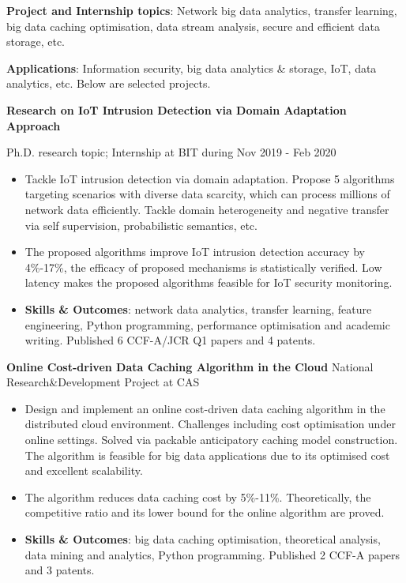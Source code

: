 \documentclass[letterpaper,10.9pt]{article}
\begin{document}
\textbf{Project and Internship topics}: Network big data analytics, transfer learning, big data caching optimisation, data stream analysis, secure and efficient data storage, etc. 

\vspace{2mm}

\textbf{Applications}: Information security, big data analytics \& storage, IoT, data analytics, etc. Below are selected projects. 

\vspace{2mm}

\textbf{Research on IoT Intrusion Detection via Domain Adaptation Approach}

Ph.D. research topic; Internship at BIT during Nov 2019 - Feb 2020

\begin{itemize}
  \setlength\itemsep{2.0pt}
  \item Tackle IoT intrusion detection via domain adaptation. Propose 5 algorithms targeting scenarios with diverse data scarcity, which can process millions of network data efficiently. Tackle domain heterogeneity and negative transfer via self supervision, probabilistic semantics, etc. 
  \item The proposed algorithms improve IoT intrusion detection accuracy by 4\%-17\%, the efficacy of proposed mechanisms is statistically verified. Low latency makes the proposed algorithms feasible for IoT security monitoring. 
  \item \textbf{Skills \& Outcomes}: network data analytics, transfer learning, feature engineering, Python programming, performance optimisation and academic writing. Published 6 CCF-A/JCR Q1 papers and 4 patents. 
\end{itemize}

\vspace{1pt}

\textbf{Online Cost-driven Data Caching Algorithm in the Cloud} \hfill National Research\&Development Project at CAS

\begin{itemize}
  \setlength\itemsep{2.0pt}
  \item Design and implement an online cost-driven data caching algorithm in the distributed cloud environment. Challenges including cost optimisation under online settings. Solved via packable anticipatory caching model construction. The algorithm is feasible for big data applications due to its optimised cost and excellent scalability. 
  \item The algorithm reduces data caching cost by 5\%-11\%. Theoretically, the competitive ratio and its lower bound for the online algorithm are proved. 
  \item \textbf{Skills \& Outcomes}: big data caching optimisation, theoretical analysis, data mining and analytics, Python programming. Published 2 CCF-A papers and 3 patents. 
\end{itemize}
\end{document}
